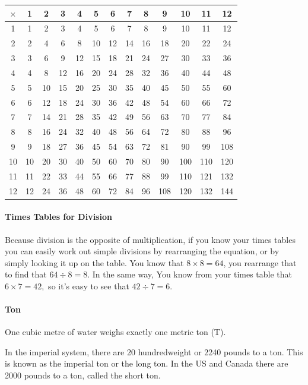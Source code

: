 \documentclass[12pt]{article}
\begin{document}
\begin{center}
\begin{tabular}{|c||c|c|c|c|c|c|c|c|c|c|c|c|}
\hline
$\times$ & 1 & 2 & 3 & 4 & 5 & 6 & 7 & 8 & 9 & 10 & 11 & 12 \\
\hline\hline
1 & 1 & 2 & 3 & 4 & 5 & 6 & 7 & 8 & 9 & 10 & 11 & 12 \\
2 & 2 & 4 & 6 & 8 & 10 & 12 & 14 & 16 & 18 & 20 & 22 & 24 \\
3 & 3 & 6 & 9 & 12 & 15 & 18 & 21 & 24 & 27 & 30 & 33 & 36 \\
4 & 4 & 8 & 12 & 16 & 20 & 24 & 28 & 32 & 36 & 40 & 44 & 48 \\
5 & 5 & 10 & 15 & 20 & 25 & 30 & 35 & 40 & 45 & 50 & 55 & 60 \\
6 & 6 & 12 & 18 & 24 & 30 & 36 & 42 & 48 & 54 & 60 & 66 & 72 \\
7 & 7 & 14 & 21 & 28 & 35 & 42 & 49 & 56 & 63 & 70 & 77 & 84 \\
8 & 8 & 16 & 24 & 32 & 40 & 48 & 56 & 64 & 72 & 80 & 88 & 96 \\
9 & 9 & 18 & 27 & 36 & 45 & 54 & 63 & 72 & 81 & 90 & 99 & 108 \\
10 & 10 & 20 & 30 & 40 & 50 & 60 & 70 & 80 & 90 & 100 & 110 & 120 \\
11 & 11 & 22 & 33 & 44 & 55 & 66 & 77 & 88 & 99 & 110 & 121 & 132 \\
12 & 12 & 24 & 36 & 48 & 60 & 72 & 84 & 96 & 108 & 120 & 132 & 144 \\
\hline
\end{tabular}
\end{center}

\paragraph{Times Tables for Division}
Because division is the opposite of multiplication, if you know your times tables you can easily work out simple divisions by rearranging the equation, or by simply looking it up on the table. You know that $8 \times 8 = 64$, you rearrange that to find that $64 \div 8 = 8.$ In the same way, You know from your times table that $6 \times 7 = 42,$ so it's easy to see that $42 \div 7 = 6.$

\paragraph{Ton}
One cubic metre of water weighs exactly one metric ton (T).

In the imperial system, there are 20 hundredweight or 2240 pounds to a ton. This is known as the imperial ton or the long ton. In the US and Canada there are 2000 pounds to a ton, called the short ton.
\end{document}
